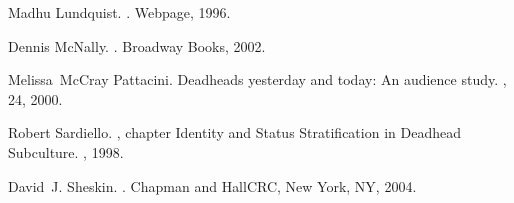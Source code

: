 \documentclass{svmult}
\begin{document}
\begin{thebibliography}{10}
Madhu Lundquist.
.
\newblock Webpage, 1996.

Dennis McNally.
.
\newblock Broadway Books, 2002.

Melissa~McCray Pattacini.
\newblock Deadheads yesterday and today: An audience study.
, 24, 2000.

Robert Sardiello.
, chapter Identity
  and Status Stratification in Deadhead Subculture.
, 1998.

David~J. Sheskin.
.
\newblock Chapman and {H}all\/{CRC}, New York, NY, 2004.

\end{thebibliography}
\end{document}
